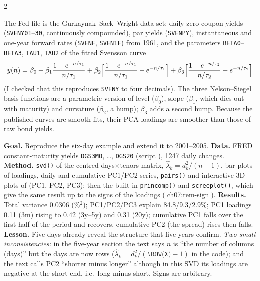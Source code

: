 \begin{paracol}{2}
\begin{finance}
The Fed file  is the Gurkaynak--Sack--Wright data set: daily zero-coupon
yields (\texttt{SVENY01}--\texttt{30}, continuously compounded), par yields (\texttt{SVENPY}), instantaneous and
one-year forward rates (\texttt{SVENF}, \texttt{SVEN1F}) from 1961, and the parameters \texttt{BETA0}--\texttt{BETA3},
\texttt{TAU1}, \texttt{TAU2} of the fitted Svensson curve
\[
  y(n)=\beta_0+\beta_1\frac{1-e^{-n/\tau_1}}{n/\tau_1}
        +\beta_2\Bigl[\frac{1-e^{-n/\tau_1}}{n/\tau_1}-e^{-n/\tau_1}\Bigr]
        +\beta_3\Bigl[\frac{1-e^{-n/\tau_2}}{n/\tau_2}-e^{-n/\tau_2}\Bigr]
\]
(I checked that this reproduces \texttt{SVENY} to four decimals). The three Nelson--Siegel basis functions
are a parametric version of level ($\beta_0$), slope ($\beta_1$, which dies out with maturity) and curvature
($\beta_2$, a hump); $\beta_3$ adds a second hump. Because the published curves are smooth fits, their PCA
loadings are smoother than those of raw bond yields.
\end{finance}

\begin{casestudy}
\textbf{Goal.} Reproduce the six-day example and extend it to 2001--2005. \textbf{Data.} FRED
constant-maturity yields \texttt{DGS3MO}, \dots, \texttt{DGS20} (script ), 1247 daily changes.
\textbf{Method.} \texttt{svd()} of the centred days$\times$tenors matrix, $\hat\lambda_k=d_k^2/(n-1)$, bar plots of
loadings, daily and cumulative PC1/PC2 series, \texttt{pairs()} and interactive 3D plots of (PC1, PC2, PC3);
then the built-in \texttt{princomp()} and \texttt{screeplot()}, which give the same result up to the signs of
the loadings (\cref{ch07:rem-sign}). \textbf{Results.} Total variance 0.0306 (\%$^2$); PC1/PC2/PC3 explain
84.8/9.3/2.9\%; PC1 loadings 0.11 (3m) rising to 0.42 (3y--5y) and 0.31 (20y); cumulative PC1 falls
over the first half of the period and recovers, cumulative PC2 (the spread) rises then falls.
\textbf{Lesson.} Five days already reveal the structure that five years confirm.
\emph{Two small inconsistencies:} in the five-year section the text says $n$ is ``the number of columns
(days)'' but the days are now rows ($\hat\lambda_k=d_k^2/(\texttt{NROW(X)}-1)$ in the code); and the text calls PC2
``shorter minus longer'' although in this SVD its loadings are negative at the short end, i.e.\ long minus
short. Signs are arbitrary.
\end{casestudy}


\end{paracol}
